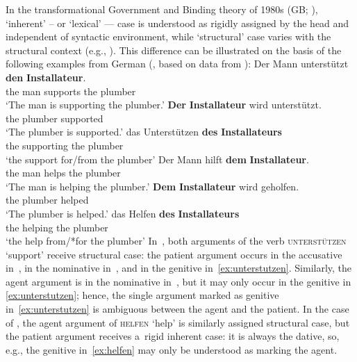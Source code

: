 \documentclass[output=paper]{langsci/langscibook}
\begin{document}
In the transformational Government and Binding theory of 1980s (GB; \citealt{chom:81,chom:86a}), `inherent’ – or `lexical’ — case is understood as rigidly assigned by the head and independent of syntactic environment, while `structural’ case varies with the structural context (e.g., \citealt[70]{Haider85b-ohne-crossref}).  This difference can be illustrated on the basis of the following examples from German (\citealt[63]{Prze99b}, based on data from \citealt{HM94a}):
\eal
\label{ex:unterstutzen}
\ex 
\gll  Der Mann unterst\"utzt \textbf{den} \textbf{Installateur}. \\ 
      the man\NOM{} supports the plumber\ACC{}\\
\glt `The man is supporting the plumber.'
\ex
\gll   \textbf{Der} \textbf{Installateur} wird unterst\"utzt. \\
      the plumber\NOM{} \Aux{} supported\\
\glt `The plumber is supported.'
\ex
\gll  das Unterst\"utzen \textbf{des} \textbf{Installateurs} \\
      the supporting the plumber\GEN{}\\
\glt `the support for/from the plumber'
\zl
\eal
\label{ex:helfen}
\ex
\gll Der Mann hilft \textbf{dem} \textbf{Installateur}. \\
     the man\NOM{} helps the plumber\DAT{}\\
\glt `The man is helping the plumber.'
\ex
\gll \textbf{Dem} \textbf{Installateur} wird geholfen. \\
     the plumber\DAT{} \Aux{} helped\\
\glt `The plumber is helped.'
\ex
\gll   das Helfen \textbf{des} \textbf{Installateurs} \\
      the helping the plumber\GEN{}\\
\glt    `the help from/*for the plumber'
\zl
In~, both arguments of the verb \textsc{unterst\"utzen} `support’ receive structural case: the patient argument occurs in the accusative in~, in the nominative in~, and in the genitive in~\cref{ex:unterstutzen}.  Similarly, the agent argument is in the nominative in~, but it may only occur in the genitive in \cref{ex:unterstutzen}; hence, the single argument marked as genitive in~\cref{ex:unterstutzen} is ambiguous between the agent and the patient.  In the case of , the agent argument of \textsc{helfen} `help’ is similarly assigned structural case, but the patient argument receives a~rigid inherent case: it is always the dative, so, e.g., the genitive in~\cref{ex:helfen} may only be understood as marking the agent.
\end{document}
